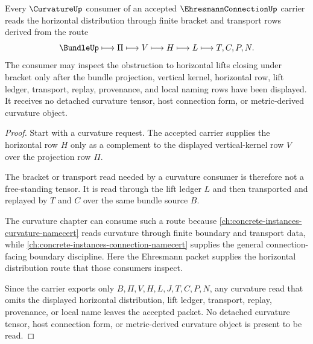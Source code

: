 \begin{theorem}
\label{thm:ehresmann-connection-curvature-consumer}
Every $\CurvatureUp$ consumer of an accepted $\EhresmannConnectionUp$ carrier reads the horizontal distribution through finite bracket and transport rows derived from the route
$$
\BundleUp \longmapsto \Pi \longmapsto V \longmapsto H \longmapsto L \longmapsto T,C,P,N .
$$
The consumer may inspect the obstruction to horizontal lifts closing under bracket only after the bundle projection, vertical kernel, horizontal row, lift ledger, transport, replay, provenance, and local naming rows have been displayed. It receives no detached curvature tensor, host connection form, or metric-derived curvature object.
\end{theorem}
\begin{proof}
Start with a curvature request. The accepted carrier supplies the horizontal row $H$ only as a complement to the displayed vertical-kernel row $V$ over the projection row $\Pi$.

The bracket or transport read needed by a curvature consumer is therefore not a free-standing tensor. It is read through the lift ledger $L$ and then transported and replayed by $T$ and $C$ over the same bundle source $B$.

The curvature chapter can consume such a route because \autoref{ch:concrete-instances-curvature-namecert} reads curvature through finite boundary and transport data, while \autoref{ch:concrete-instances-connection-namecert} supplies the general connection-facing boundary discipline. Here the Ehresmann packet supplies the horizontal distribution route that those consumers inspect.

Since the carrier exports only $B,\Pi,V,H,L,J,T,C,P,N$, any curvature read that omits the displayed horizontal distribution, lift ledger, transport, replay, provenance, or local name leaves the accepted packet. No detached curvature tensor, host connection form, or metric-derived curvature object is present to be read.
\end{proof}


